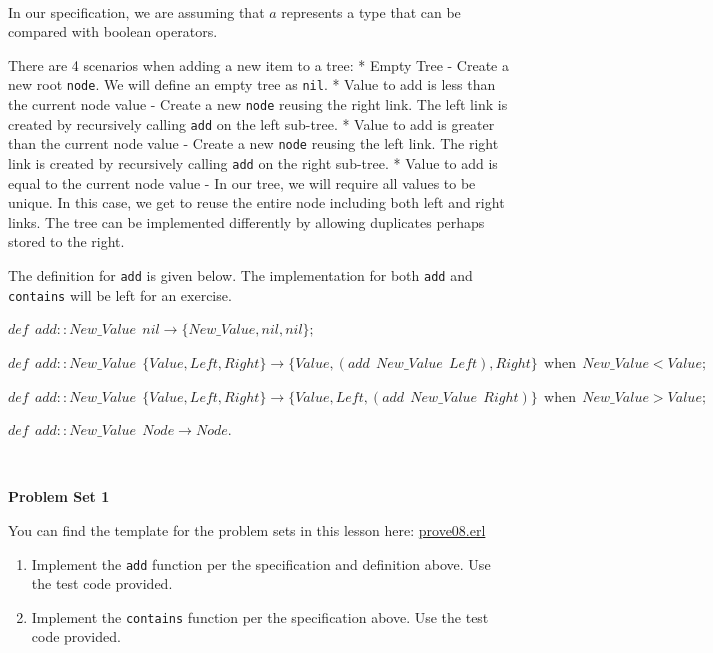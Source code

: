 \documentclass[
]{book}
\providecommand{\tightlist}{%
  \setlength{\itemsep}{0pt}\setlength{\parskip}{0pt}}
\begin{document}
\(\nonumber\)

In our specification, we are assuming that \(a\) represents a type that can be compared with boolean operators.

There are 4 scenarios when adding a new item to a tree:
* Empty Tree - Create a new root \texttt{node}. We will define an empty tree as \texttt{nil}.
* Value to add is less than the current node value - Create a new \texttt{node} reusing the right link. The left link is created by recursively calling \texttt{add} on the left sub-tree.
* Value to add is greater than the current node value - Create a new \texttt{node} reusing the left link. The right link is created by recursively calling \texttt{add} on the right sub-tree.
* Value to add is equal to the current node value - In our tree, we will require all values to be unique. In this case, we get to reuse the entire node including both left and right links. The tree can be implemented differently by allowing duplicates perhaps stored to the right.

The definition for \texttt{add} is given below. The implementation for both \texttt{add} and \texttt{contains} will be left for an exercise.

\begin{formulabox}
\(\mathit{def} ~ ~ add :: New\_Value ~ ~ nil \rightarrow \lbrace New\_Value, nil, nil \rbrace;\)

\(\mathit{def} ~ ~ add :: New\_Value ~ ~ \lbrace Value, Left, Right \rbrace \rightarrow \lbrace Value, (add ~ ~ New\_Value ~ ~ Left), Right \rbrace ~ ~ \text{when} ~ ~ New\_Value < Value;\)

\(\mathit{def} ~ ~ add :: New\_Value ~ ~ \lbrace Value, Left, Right \rbrace \rightarrow \lbrace Value, Left, (add ~ ~ New\_Value ~ ~ Right) \rbrace ~ ~ \text{when} ~ ~ New\_Value > Value;\)

\(\mathit{def} ~ ~ add :: New\_Value ~ ~ Node \rightarrow Node.\)

\end{formulabox}

\(\nonumber\)

\begin{problembox}

\textbf{Problem Set 1}

You can find the template for the problem sets in this lesson here: \href{proves/prove08.erl}{prove08.erl}

\begin{enumerate}
\def\labelenumi{\arabic{enumi}.}
\tightlist
\item
  Implement the \texttt{add} function per the specification and definition above. Use the test code provided.
\item
  Implement the \texttt{contains} function per the specification above. Use the test code provided.
\end{enumerate}

\end{problembox}
\end{document}
